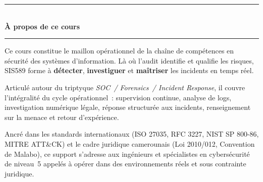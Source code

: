 \documentclass[12pt, a4paper, twoside, openright]{book}
\begin{document}
\clearpage
\printindex
{}


\clearpage
\appendix






\clearpage
\thispagestyle{empty}
\pagecolor{CouleurPrimaire}


\vspace*{2.5cm}

\begin{center}
    {\color{CouleurAccent}\rule{0.6\linewidth}{1pt}}\\[1.5ex]
    {\color{white}\Large\bfseries À propos de ce cours}\\[1.5ex]
    {\color{CouleurAccent}\rule{0.6\linewidth}{1pt}}
\end{center}

\vspace{1cm}

\begin{center}
\begin{minipage}{0.75\textwidth}
\color{white!85!gray}
Ce cours constitue le maillon opérationnel de la chaîne de compétences en
sécurité des systèmes d'information. Là où l'audit identifie et qualifie les
risques, SIS589 forme à \textbf{détecter}, \textbf{investiguer} et \textbf{maîtriser}
les incidents en temps réel.

\medskip

Articulé autour du triptyque \textit{SOC~/ Forensics~/ Incident Response},
il couvre l'intégralité du cycle opérationnel~: supervision continue,
analyse de logs, investigation numérique légale, réponse structurée aux
incidents, renseignement sur la menace et retour d'expérience.

\medskip

Ancré dans les standards internationaux (ISO 27035, RFC 3227,
NIST SP 800-86, MITRE ATT\&CK) et le cadre juridique camerounais
(Loi 2010/012, Convention de Malabo), ce support s'adresse aux
ingénieurs et spécialistes en cybersécurité de niveau~5 appelés à
opérer dans des environnements réels et sous contrainte juridique.
\end{minipage}
\end{center}
\end{document}
